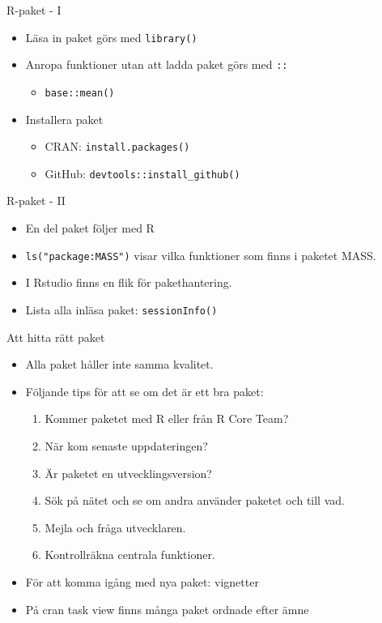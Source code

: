 \documentclass[
  11pt,
  ignorenonframetext,
]{beamer}
\providecommand{\tightlist}{%
  \setlength{\itemsep}{0pt}\setlength{\parskip}{0pt}}
\begin{document}
\begin{frame}{R-paket - I}
\protect\hypertarget{r-paket---i}{}
\begin{itemize}
\tightlist
\item
  Läsa in paket görs med \texttt{library()}
\item
  Anropa funktioner utan att ladda paket görs med \texttt{::}

  \begin{itemize}
  \tightlist
  \item
    \texttt{base::mean()}
  \end{itemize}
\item
  Installera paket

  \begin{itemize}
  \tightlist
  \item
    CRAN: \texttt{install.packages()}
  \item
    GitHub: \texttt{devtools::install\_github()}
  \end{itemize}
\end{itemize}
\end{frame}

\begin{frame}{R-paket - II}
\protect\hypertarget{r-paket---ii}{}
\begin{itemize}
\tightlist
\item
  En del paket följer med R
\item
  \texttt{ls("package:MASS")} visar vilka funktioner som finns i paketet
  MASS.
\item
  I Rstudio finns en flik för pakethantering.
\item
  Lista alla inläsa paket: \texttt{sessionInfo()}
\end{itemize}
\end{frame}

\begin{frame}{Att hitta rätt paket}
\protect\hypertarget{att-hitta-ruxe4tt-paket}{}
\begin{itemize}
\tightlist
\item
  Alla paket håller inte samma kvalitet.
\item
  Följande tips för att se om det är ett bra paket:

  \begin{enumerate}
  \tightlist
  \item
    Kommer paketet med R eller från R Core Team?
  \item
    När kom senaste uppdateringen?
  \item
    Är paketet en utvecklingsversion?
  \item
    Sök på nätet och se om andra använder paketet och till vad.
  \item
    Mejla och fråga utvecklaren.
  \item
    Kontrollräkna centrala funktioner.
  \end{enumerate}
\item
  För att komma igång med nya paket: vignetter
\item
  På cran task view finns många paket ordnade efter ämne
\end{itemize}
\end{frame}
\end{document}
